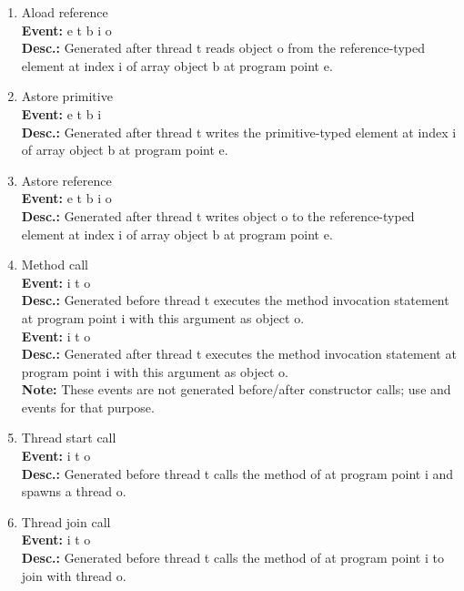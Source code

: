 \begin{enumerate}
\item
Aload reference \\
{\bf Event:}  e t b i o \\
{\bf Desc.:} Generated after thread t reads object o from the reference-typed element at index i of array object b at program point e.

\item
Astore primitive \\
{\bf Event:}  e t b i \\
{\bf Desc.:} Generated after thread t writes the primitive-typed element at index i of array object b at program point e.

\item
Astore reference \\
{\bf Event:}  e t b i o \\
{\bf Desc.:} Generated after thread t writes object o to the reference-typed element at index i of array object b at program point e.

\item
Method call \\
{\bf Event:}  i t o \\
{\bf Desc.:} Generated before thread t executes the method invocation statement at program point i with this argument as object o. \\
{\bf Event:}  i t o \\
{\bf Desc.:} Generated after thread t executes the method invocation statement at program point i with this argument as object o. \\
{\bf Note:} These events are not generated before/after constructor calls; use  and  events for that purpose.

\item
Thread start call \\
{\bf Event:}  i t o \\
{\bf Desc.:} Generated before thread t calls the  method of  at program point i and spawns a thread o. 

\item
Thread join call \\
{\bf Event:}  i t o \\
{\bf Desc.:} Generated before thread t calls the  method of  at program point i to join with thread o.


\end{enumerate}
